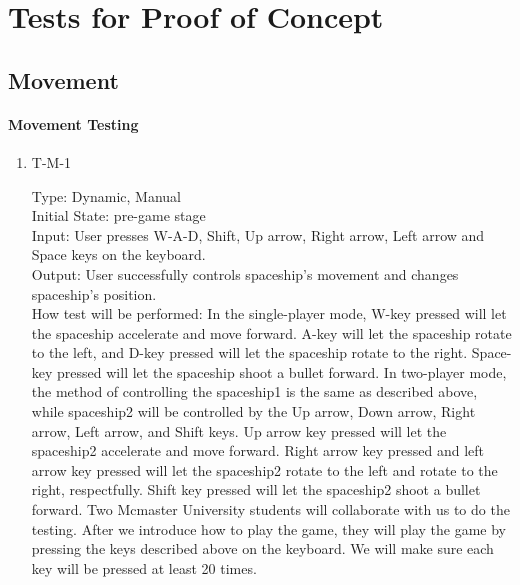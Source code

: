 \documentclass[12pt, titlepage]{article}
\begin{document}
\section{Tests for Proof of Concept}

\subsection{Movement}
		
\paragraph{Movement Testing}

\begin{enumerate}

\item{T-M-1\\}

Type: Dynamic, Manual\\		
	
Initial State: pre-game stage\\

Input:  User presses W-A-D, Shift, Up arrow, Right arrow, Left arrow and Space keys on the keyboard.\\
					
Output: User successfully controls spaceship’s movement and changes spaceship's position.\\
					
How test will be performed:  In the single-player mode, W-key pressed will let the spaceship accelerate and move forward. A-key will let the spaceship rotate to the left, and D-key pressed will let the spaceship rotate to the right. Space-key pressed will let the spaceship shoot a bullet forward. In two-player mode, the method of controlling the spaceship1 is the same as described above, while spaceship2 will be controlled by the Up arrow, Down arrow, Right arrow, Left arrow, and Shift keys. Up arrow key pressed will let the spaceship2 accelerate and move forward. Right arrow key pressed and left arrow key pressed will let the spaceship2 rotate to the left and rotate to the right, respectfully. Shift key pressed will let the spaceship2 shoot a bullet forward. Two Mcmaster University students will collaborate with us to do the testing. After we introduce how to play the game, they will play the game by pressing the keys described above on the keyboard. We will make sure each key will be pressed at least 20 times. \\

\end{enumerate}
\end{document}
